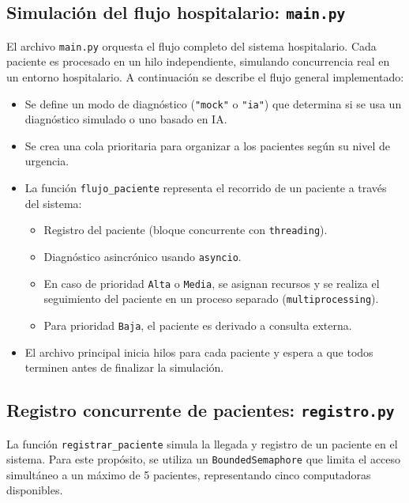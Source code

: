 \documentclass{article}
\begin{document}
\subsection{Simulación del flujo hospitalario: \texttt{main.py}}

El archivo \texttt{main.py} orquesta el flujo completo del sistema hospitalario. Cada paciente es procesado en un hilo independiente, simulando concurrencia real en un entorno hospitalario. A continuación se describe el flujo general implementado:

\begin{itemize}
    \item Se define un modo de diagnóstico (\texttt{"mock"} o \texttt{"ia"}) que determina si se usa un diagnóstico simulado o uno basado en IA.
    \item Se crea una cola prioritaria para organizar a los pacientes según su nivel de urgencia.
    \item La función \texttt{flujo\_paciente} representa el recorrido de un paciente a través del sistema:
          \begin{itemize}
              \item Registro del paciente (bloque concurrente con \texttt{threading}).
              \item Diagnóstico asincrónico usando \texttt{asyncio}.
              \item En caso de prioridad \texttt{Alta} o \texttt{Media}, se asignan recursos y se realiza el seguimiento del paciente en un proceso separado (\texttt{multiprocessing}).
              \item Para prioridad \texttt{Baja}, el paciente es derivado a consulta externa.
          \end{itemize}
    \item El archivo principal inicia hilos para cada paciente y espera a que todos terminen antes de finalizar la simulación.
\end{itemize}

\subsection{Registro concurrente de pacientes: \texttt{registro.py}}

La función \texttt{registrar\_paciente} simula la llegada y registro de un paciente en el sistema. Para este propósito, se utiliza un \texttt{BoundedSemaphore} que limita el acceso simultáneo a un máximo de 5 pacientes, representando cinco computadoras disponibles.
\end{document}
